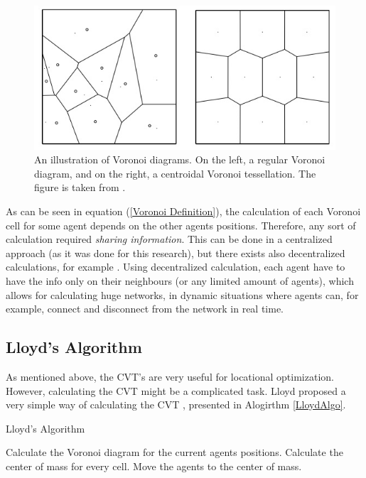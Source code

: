 \documentclass{iacas}
\begin{document}
\begin{figure}[!ht]
\centering
\includegraphics[scale=0.5]{figures/voronoi_partitioning.jpg}
\caption{An illustration of Voronoi diagrams. On the left, a regular Voronoi diagram, and on the right, a centroidal Voronoi tessellation. The figure is taken from \cite{Du1999}.} %
\label{fig:Voronoi_tessellation_illustration}
\end{figure}

As can be seen in equation (\ref{Voronoi Definition}), the calculation of each Voronoi cell for some agent depends on the other agents positions. Therefore, any sort of calculation required \emph{sharing information}. This can be done in a centralized approach (as it was done for this research), but there exists also decentralized calculations, for example \cite{Adams2009}. Using decentralized calculation, each agent have to have the info only on their neighbours (or any limited amount of agents), which allows for calculating huge networks, in dynamic situations where agents can, for example, connect and disconnect from the network in real time.

\subsection{Lloyd's Algorithm}
As mentioned above, the CVT's are very useful for locational optimization. However, calculating the CVT might be a complicated task. Lloyd proposed a very simple way of calculating the CVT \cite{Lloyd1982}, presented in Alogirthm \ref{LloydAlgo}. %
\begin{algorithm}
\caption{Lloyd's Algorithm}\label{LloydAlgo}
\begin{algorithmic}[1]
\State Calculate the Voronoi diagram for the current agents positions.
\State Calculate the center of mass for every cell.
\State Move the agents to the center of mass.
\end{algorithmic}
\end{algorithm}
\end{document}
